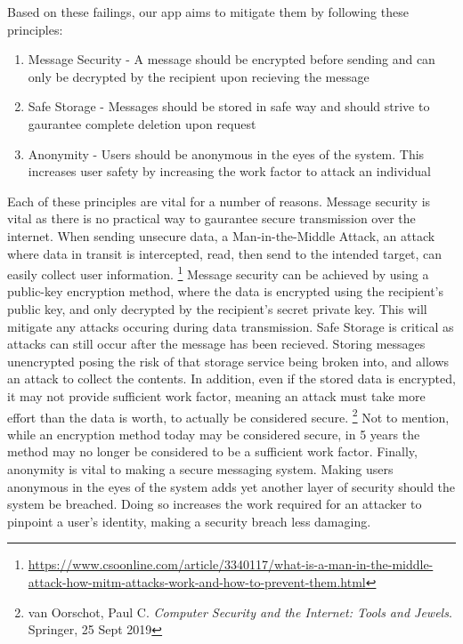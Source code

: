 \documentclass[titlepage]{article}
\begin{document}
    Based on these failings, our app aims to mitigate them by following these principles:
    \begin{enumerate}
        \item Message Security - A message should be encrypted before sending and can only be decrypted by the recipient upon recieving the message
        \item Safe Storage - Messages should be stored in safe way and should strive to gaurantee complete deletion upon request
        \item Anonymity - Users should be anonymous in the eyes of the system. This increases user safety by increasing the work factor to attack an individual
    \end{enumerate}
    Each of these principles are vital for a number of reasons.
    Message security is vital as there is no practical way to gaurantee secure transmission over the internet.
    When sending unsecure data, a Man-in-the-Middle Attack, an attack where data in transit is intercepted, read, then send to the intended target, can easily collect user information.
    \footnote{\url{https://www.csoonline.com/article/3340117/what-is-a-man-in-the-middle-attack-how-mitm-attacks-work-and-how-to-prevent-them.html}}
    Message security can be achieved by using a public-key encryption method, where the data is encrypted using the recipient's public key, and only decrypted by the recipient's secret private key.
    This will mitigate any attacks occuring during data transmission.
    Safe Storage is critical as attacks can still occur after the message has been recieved.
    Storing messages unencrypted posing the risk of that storage service being broken into, and allows an attack to collect the contents.
    In addition, even if the stored data is encrypted, it may not provide sufficient work factor, meaning an attack must take more effort than the data is worth, to actually be considered secure.
    \footnote{van Oorschot, Paul C. \textit{Computer Security and the Internet: Tools and Jewels}. Springer, 25 Sept 2019}
    Not to mention, while an encryption method today may be considered secure, in 5 years the method may no longer be considered to be a sufficient work factor.
    Finally, anonymity is vital to making a secure messaging system.
    Making users anonymous in the eyes of the system adds yet another layer of security should the system be breached.
    Doing so increases the work required for an attacker to pinpoint a user's identity, making a security breach less damaging.
\end{document}
